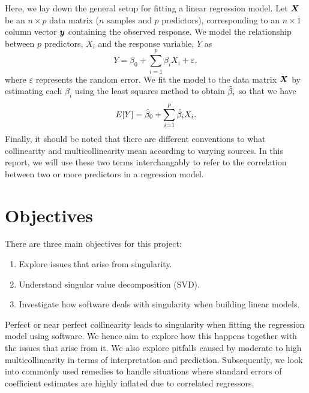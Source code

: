 \documentclass[12pt]{article}
\newcommand{\gbh}{\hat{\gb}}
\begin{document}
	Here, we lay down the general setup for fitting a linear regression model. Let $\boldsymbol{X}$ be an $n\times p$ data matrix ($n$ samples and $p$ predictors), corresponding to an $n\times 1$ column vector $\boldsymbol{y}$ containing the observed response. We model the relationship between $p$ predictors, $X_i$  and the response variable, $Y$ as
	\begin{equation}
		Y=\beta_0+\sum_{i=1}^{p}\beta_i X_i+\varepsilon,
	\end{equation}
	where $\varepsilon$ represents the random error. We fit the model to the data matrix $\boldsymbol{X}$ by estimating each $\beta_i$ using the least squares method to obtain $\gbh_i$ so that we have
	\begin{equation}
		E[Y]=\gbh_0+\sum_{i=1}^{p}\gbh_iX_i.
	\end{equation}
	Finally, it should be noted that there are different conventions to what collinearity and multicollinearity mean according to varying sources. In this report, we will use these two terms interchangably to refer to the correlation between two or more predictors in a regression model.
	
	\section{Objectives}
	
	There are three main objectives for this project:
	
	\begin{enumerate}
		\item Explore issues that arise from singularity.
		\item Understand singular value decomposition (SVD).
		\item Investigate how software deals with singularity when building linear models.
	\end{enumerate}
	
	Perfect or near perfect collinearity leads to singularity when fitting the regression model using software. We hence aim to explore how this happens together with the issues that arise from it. We also explore pitfalls caused by moderate to high multicollinearity in terms of interpretation and prediction. Subsequently, we look into commonly used remedies to handle situations where standard errors of coefficient estimates are highly inflated due to correlated regressors.\\
	
\end{document}
